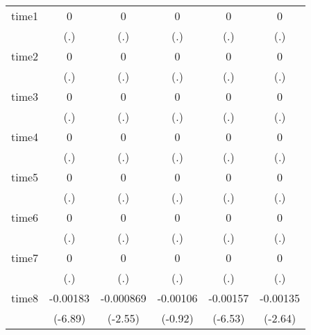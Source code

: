 \begin{table}[htbp]
\begin{tabular}{l*{5}{c}}
time1       &           0         &           0         &           0         &           0         &           0         \\
            &         (.)         &         (.)         &         (.)         &         (.)         &         (.)         \\
time2       &           0         &           0         &           0         &           0         &           0         \\
            &         (.)         &         (.)         &         (.)         &         (.)         &         (.)         \\
time3       &           0         &           0         &           0         &           0         &           0         \\
            &         (.)         &         (.)         &         (.)         &         (.)         &         (.)         \\
time4       &           0         &           0         &           0         &           0         &           0         \\
            &         (.)         &         (.)         &         (.)         &         (.)         &         (.)         \\
time5       &           0         &           0         &           0         &           0         &           0         \\
            &         (.)         &         (.)         &         (.)         &         (.)         &         (.)         \\
time6       &           0         &           0         &           0         &           0         &           0         \\
            &         (.)         &         (.)         &         (.)         &         (.)         &         (.)         \\
time7       &           0         &           0         &           0         &           0         &           0         \\
            &         (.)         &         (.)         &         (.)         &         (.)         &         (.)         \\
time8       &    -0.00183\sym{***}&   -0.000869\sym{*}  &    -0.00106         &    -0.00157\sym{***}&    -0.00135\sym{**} \\
            &     (-6.89)         &     (-2.55)         &     (-0.92)         &     (-6.53)         &     (-2.64)         \\

\end{tabular}
\end{table}
